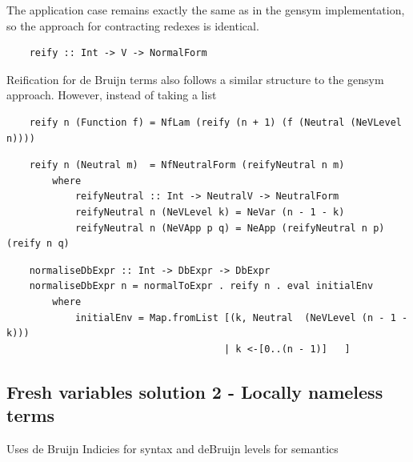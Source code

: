 The application case remains exactly the same as in the gensym implementation, so the approach for contracting redexes is identical.

\begin{lstlisting}
    reify :: Int -> V -> NormalForm
\end{lstlisting}

Reification for de Bruijn terms also follows a similar structure to the gensym approach. However, instead of taking a list 


\begin{lstlisting}
    reify n (Function f) = NfLam (reify (n + 1) (f (Neutral (NeVLevel n))))
\end{lstlisting}

\begin{lstlisting}
    reify n (Neutral m)  = NfNeutralForm (reifyNeutral n m)
        where 
            reifyNeutral :: Int -> NeutralV -> NeutralForm
            reifyNeutral n (NeVLevel k) = NeVar (n - 1 - k)
            reifyNeutral n (NeVApp p q) = NeApp (reifyNeutral n p) (reify n q)
\end{lstlisting}

\begin{lstlisting}
    normaliseDbExpr :: Int -> DbExpr -> DbExpr
    normaliseDbExpr n = normalToExpr . reify n . eval initialEnv 
        where
            initialEnv = Map.fromList [(k, Neutral  (NeVLevel (n - 1 - k))) 
                                      | k <-[0..(n - 1)]   ] 
\end{lstlisting}

\subsection{Fresh variables solution 2 - Locally nameless terms}

Uses de Bruijn Indicies for syntax and deBruijn levels for semantics




